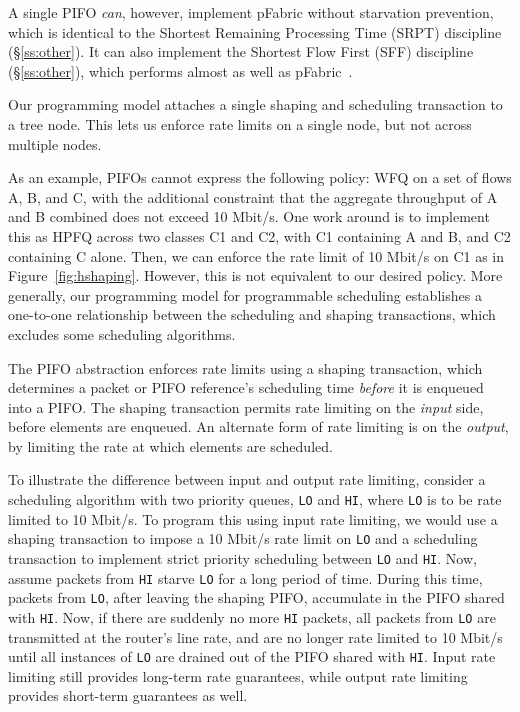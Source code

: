 A single PIFO {\em can}, however, implement pFabric without starvation
prevention, which is identical to the Shortest Remaining Processing Time (SRPT)
discipline (\S\ref{ss:other}).  It can also implement the Shortest Flow First
(SFF) discipline (\S\ref{ss:other}), which performs almost as well as
pFabric~\cite{pFabric}.

  Our
programming model attaches a single shaping and scheduling transaction to a
tree node. This lets us enforce rate limits on a single node, but not across
multiple nodes.

As an example, PIFOs cannot express the following policy: WFQ on a set of flows
A, B, and C, with the additional constraint that the aggregate throughput of A
and B combined does not exceed 10 Mbit/s. One work around is to implement this
as HPFQ across two classes C1 and C2, with C1 containing A and B, and C2
containing C alone. Then, we can enforce the rate limit of 10 Mbit/s on C1 as
in Figure~\ref{fig:hshaping}. However, this is not equivalent to our desired
policy. More generally, our programming model for programmable scheduling
establishes a one-to-one relationship between the scheduling and shaping
transactions, which excludes some scheduling algorithms.

 The PIFO abstraction enforces rate limits using a
shaping transaction, which determines a packet or PIFO reference's scheduling
time {\em before} it is enqueued into a PIFO.  The shaping transaction permits
rate limiting on the {\em input} side, \ie before elements are enqueued. An
alternate form of rate limiting is on the {\em output}, \ie by limiting the
rate at which elements are scheduled.

To illustrate the difference between input and output rate limiting, consider a
scheduling algorithm with two priority queues, \texttt{LO} and \texttt{HI},
where \texttt{LO} is to be rate limited to 10 Mbit/s. To program this using
input rate limiting, we would use a shaping transaction to impose a 10 Mbit/s
rate limit on \texttt{LO} and a scheduling transaction to implement strict
priority scheduling between \texttt{LO} and \texttt{HI}. Now, assume packets
from \texttt{HI} starve \texttt{LO} for a long period of time. During this
time, packets from \texttt{LO}, after leaving the shaping PIFO, accumulate in
the PIFO shared with \texttt{HI}. Now, if there are suddenly no more
\texttt{HI} packets, all packets from \texttt{LO} are transmitted at the
router's line rate, and are no longer rate limited to 10 Mbit/s until all
instances of \texttt{LO} are drained out of the PIFO shared with \texttt{HI}.
Input rate limiting still provides long-term rate guarantees, while output rate
limiting provides short-term guarantees as well.
